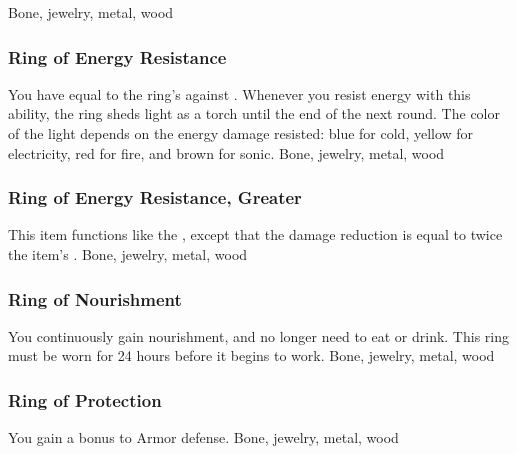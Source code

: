  
 Bone, jewelry, metal, wood
\lowercase{\hypertarget{item:Ring of Energy Resistance}{}}\label{item:Ring of Energy Resistance}
\hypertarget{item:Ring of Energy Resistance}{\subsubsection{Ring of Energy Resistance\hfill{}}}
You have  equal to the ring's  against .
Whenever you resist energy with this ability, the ring sheds light as a torch until the end of the next round.
The color of the light depends on the energy damage resisted: blue for cold, yellow for electricity, red for fire, and brown for sonic.
 
 Bone, jewelry, metal, wood
\lowercase{\hypertarget{item:Ring of Energy Resistance, Greater}{}}\label{item:Ring of Energy Resistance, Greater}
\hypertarget{item:Ring of Energy Resistance, Greater}{\subsubsection{Ring of Energy Resistance, Greater\hfill{}}}
This item functions like the , except that the damage reduction is equal to twice the item's .
 
 Bone, jewelry, metal, wood
\lowercase{\hypertarget{item:Ring of Nourishment}{}}\label{item:Ring of Nourishment}
\hypertarget{item:Ring of Nourishment}{\subsubsection{Ring of Nourishment\hfill{}}}
You continuously gain nourishment, and no longer need to eat or drink.
This ring must be worn for 24 hours before it begins to work.
 
 Bone, jewelry, metal, wood
\lowercase{\hypertarget{item:Ring of Protection}{}}\label{item:Ring of Protection}
\hypertarget{item:Ring of Protection}{\subsubsection{Ring of Protection\hfill{}}}
You gain a  bonus to Armor defense.
 
 Bone, jewelry, metal, wood
\lowercase{\hypertarget{item:Ring of Regeneration}{}}\label{item:Ring of Regeneration}
